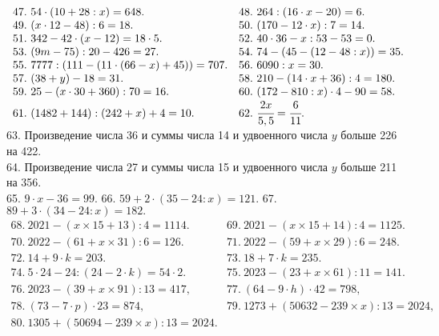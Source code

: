 $\begin{array}{ll}
47.\ 54\cdot(10+28:x)=648.&
48.\ 264:(16\cdot x-20)=6.\\
49.\ (x\cdot12-48):6=18.&
50.\ (170-12\cdot x):7=14.\\
51.\ 342-42\cdot(x-12)=18\cdot5.&
52.\ 40\cdot36-x:53-53=0.\\
53.\ (9m-75):20-426=27.&
54.\ 74-(45-(12-48:x))=35.\\
55.\ 7777:(111-(11\cdot(66-x)+45))=707.&
56.\ 6090:x=30.\\
57.\ (38+y)-18=31.&
58.\ 210-(14\cdot x+36):4=180.\\
59.\ 25-(x\cdot30+360):70=16.&
60.\ (172-810:x)\cdot4-90=58.\\
61.\ (1482+144):(242+x)+4=10.&
62.\ \cfrac{2x}{5,5}=\cfrac{6}{11}.
\end{array}$\\
63. Произведение числа 36 и суммы числа 14 и удвоенного числа $y$ больше 226 на 422.\\
64. Произведение числа 27 и суммы числа 15 и удвоенного числа $y$ больше 211 на 356.\\
65. $9\cdot x -36=99.$ 66. $59+2\cdot(35-24:x)=121.$ 67. $89+3\cdot(34-24:x)=182.$\\
$\begin{array}{ll}
68.\ 2021-(x\times15+13):4=1114.& 69.\ 2021-(x\times15+14):4=1125.\\
70.\ 2022-(61+x\times31):6=126.& 71.\ 2022-(59+x\times29):6=248.\\
72.\ 14+9\cdot k=203.& 73.\ 18+7\cdot k=235.\\
74.\ 5\cdot24-24:(24-2\cdot k)=54\cdot2.&
75.\ 2023 - (23 + x \times 61) : 11 = 141.\\
76.\ 2023 - (39 + x \times 91) : 13 = 417,&
77.\ (64 - 9 \cdot h) \cdot 42 = 798,\\
78.\ (73 - 7 \cdot p) \cdot 23 = 874,&
79.\ 1273+(50632-239\times x):13=2024,\\
80.\ 1305+(50694-239\times x):13=2024.
\end{array}$
\newpage
